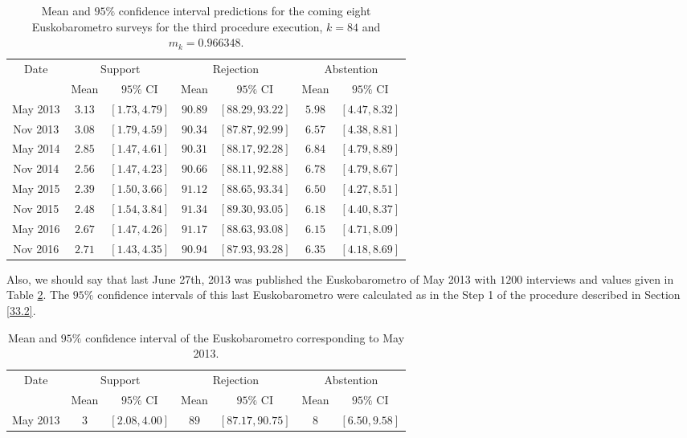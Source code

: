 \begin{table}[h]
\centering
\begin{small}
\begin{tabular}{|c|c|c|c|c|c|c|}
\hline
Date    & \multicolumn{2}{c|}{Support} & \multicolumn{2}{c|}{Rejection} & \multicolumn{2}{c|}{Abstention} 	\\
		& Mean & $95\%$ CI & Mean & $95\%$ CI & Mean & $95\%$ CI \\
\hline
May 2013 & $  3.13$ & $[  1.73,  4.79]$ & $ 90.89$ & $[ 88.29, 93.22]$ & $  5.98$ & $[  4.47,  8.32]$ \\ 
Nov 2013 & $  3.08$ & $[  1.79,  4.59]$ & $ 90.34$ & $[ 87.87, 92.99]$ & $  6.57$ & $[  4.38,  8.81]$ \\ 
May 2014 & $  2.85$ & $[  1.47,  4.61]$ & $ 90.31$ & $[ 88.17, 92.28]$ & $  6.84$ & $[  4.79,  8.89]$ \\ 
Nov 2014 & $  2.56$ & $[  1.47,  4.23]$ & $ 90.66$ & $[ 88.11, 92.88]$ & $  6.78$ & $[  4.79,  8.67]$ \\ 
May 2015 & $  2.39$ & $[  1.50,  3.66]$ & $ 91.12$ & $[ 88.65, 93.34]$ & $  6.50$ & $[  4.27,  8.51]$ \\ 
Nov 2015 & $  2.48$ & $[  1.54,  3.84]$ & $ 91.34$ & $[ 89.30, 93.05]$ & $  6.18$ & $[  4.40,  8.37]$ \\ 
May 2016 & $  2.67$ & $[  1.47,  4.26]$ & $ 91.17$ & $[ 88.63, 93.08]$ & $  6.15$ & $[  4.71,  8.09]$ \\ 
Nov 2016 & $  2.71$ & $[  1.43,  4.35]$ & $ 90.94$ & $[ 87.93, 93.28]$ & $  6.35$ & $[  4.18,  8.69]$ \\ 
\hline 
\end{tabular} 
\end{small}
\caption{Mean and $95\%$ confidence interval predictions for the coming eight Euskobarometro surveys for the third procedure execution, $k=84$ and $m_k=0.966348$.}
\label{c3TABLA5} 
\end{table}

Also, we should say that last June 27th, 2013 was published the Euskobarometro of May 2013 with $1200$ interviews and values given in Table \ref{c3TABLA6}. The $95\%$ confidence intervals of this last Euskobarometro were calculated as in the Step 1 of the procedure described in Section \ref{33.2}.

\begin{table}[h]
\centering
\begin{small}
\begin{tabular}{|c|c|c|c|c|c|c|}
\hline
Date    & \multicolumn{2}{c|}{Support} & \multicolumn{2}{c|}{Rejection} & \multicolumn{2}{c|}{Abstention} 	\\
		& Mean & $95\%$ CI & Mean & $95\%$ CI & Mean & $95\%$ CI \\
\hline
May 2013 & $3$ & $[ 2.08,  4.00]$ & $89$ & $[ 87.17, 90.75]$ & $8$ & $[  6.50,  9.58]$ \\ 
\hline 
\end{tabular} 
\end{small}
\caption{Mean and $95\%$ confidence interval of the Euskobarometro corresponding to May 2013.}
\label{c3TABLA6} 
\end{table}

